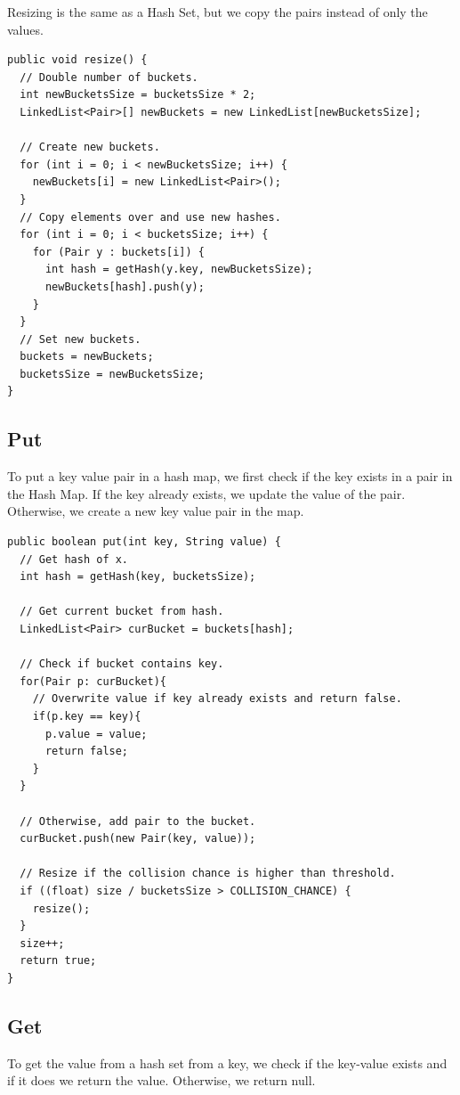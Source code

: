\documentclass[11pt,oneside]{book}
\begin{document}
Resizing is the same as a Hash Set, but we copy the pairs instead of only the values.

\begin{lstlisting}
public void resize() {
  // Double number of buckets.
  int newBucketsSize = bucketsSize * 2;
  LinkedList<Pair>[] newBuckets = new LinkedList[newBucketsSize];
  
  // Create new buckets.
  for (int i = 0; i < newBucketsSize; i++) {
    newBuckets[i] = new LinkedList<Pair>();
  }
  // Copy elements over and use new hashes.
  for (int i = 0; i < bucketsSize; i++) {
    for (Pair y : buckets[i]) {
      int hash = getHash(y.key, newBucketsSize);
      newBuckets[hash].push(y);
    }
  }
  // Set new buckets.
  buckets = newBuckets;
  bucketsSize = newBucketsSize;
}
\end{lstlisting}

\subsection{Put}

To put a key value pair in a hash map, we first check if the key exists in a pair in the Hash Map. If the key already exists, we update the value of the pair. Otherwise, we create a new key value pair in the map.

\begin{lstlisting}
public boolean put(int key, String value) {
  // Get hash of x.
  int hash = getHash(key, bucketsSize);

  // Get current bucket from hash.
  LinkedList<Pair> curBucket = buckets[hash];
  
  // Check if bucket contains key.
  for(Pair p: curBucket){
    // Overwrite value if key already exists and return false.
    if(p.key == key){
      p.value = value;
      return false;
    }
  }
  
  // Otherwise, add pair to the bucket.
  curBucket.push(new Pair(key, value));
  
  // Resize if the collision chance is higher than threshold.
  if ((float) size / bucketsSize > COLLISION_CHANCE) {
    resize();
  }
  size++;
  return true;
}
\end{lstlisting}

\subsection{Get}

To get the value from a hash set from a key, we check if the key-value exists and if it does we return the value. Otherwise, we return null.
\end{document}
